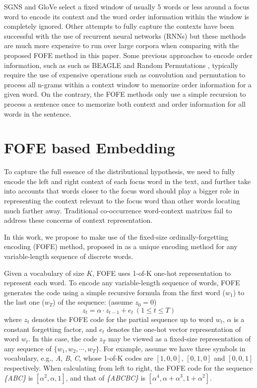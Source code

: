 \documentclass[11pt,letterpaper]{article}
\begin{document}
SGNS and GloVe \cite{pennington} select a fixed window of usually 5 words or less around a focus word to encode its context and the word order information within the window is completely ignored. Other attempts to fully capture the contexts have been successful with the use of recurrent neural networks (RNNs) but these methods are much more expensive to run over large corpora when comparing with the proposed FOFE method in this paper. Some previous approaches to encode order information, such as such as BEAGLE \cite{beagle} and Random Permutations \cite{rand}, typically require the use of  expensive operations such as convolution and permutation to process all n-grams within a context window to memorize order information for a given word. On the contrary, the FOFE methods only use a simple recursion to process a sentence once to memorize both context and order information for all words in the sentence. 

\section{FOFE based Embedding}
\label{sec_FOFE}
To capture the full essence of the distributional hypothesis, we need to fully encode the left and right context of each focus word in the text, and further take into accounts that words closer to the focus word should play a bigger role in representing the context relevant to the focus word than other words locating much farther away. 
Traditional co-occurrence word-context matrixes fail to address these concerns of context representation. 

In this work, we propose to make use of the fixed-size ordinally-forgetting encoding (FOFE) method, proposed in  \cite{zhang} as a unique encoding method for any variable-length sequence of discrete words. 

Given a vocabulary of size $K$, FOFE uses 1-of-K one-hot representation to represent each word. To encode any variable-length sequence of words, FOFE generates the code using a simple recursive formula from the first word ($w_1$) to the last one ($w_T$) of  the sequence: (assume $z_0 = 0$)
\begin{equation}
z_{t}=\alpha \cdot z_{t-1}+e_{t}\ (1 \leq t \leq T)
\end{equation}
where $z_{t}$ denotes the FOFE code for the partial sequence up to word $w_{t}$, $\alpha$ is a constant forgetting factor, and $e_{t}$ denotes the one-hot vector representation of word $w_t$. 
In this case, the code $z_T$ may be viewed as a fixed-size representation of any sequence of $\{w_1, w_2, \cdots, w_T\}$. 
For example, assume we have three symbols in vocabulary, e.g., {\em A}, {\em B}, {\em C}, whose 1-of-K codes are $[1,0,0]$, $[0,1,0]$ and $[0,0,1]$ respectively. When calculating from left to right, the FOFE code for the sequence {\em \{ABC\}} is $[\alpha^2, \alpha ,1]$, and that of {\em \{ABCBC\}} is $[\alpha^4, \alpha+\alpha^3 ,1+\alpha^2]$.
\end{document}
